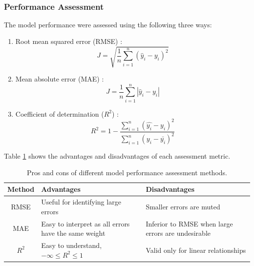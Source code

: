 \subsubsection{Performance Assessment}
The model performance were assessed using the following three ways:
\begin{enumerate}
    \item Root mean squared error (RMSE) \cite{NN}:
    \begin{equation}
        J = \sqrt{\frac{1}{n}\sum\limits^n_{i=1}(\hat{y}_i - y_i)^2}
        \label{eq:08RMSE}
    \end{equation}
    
    \item Mean absolute error (MAE) \cite{NN}:
    \begin{equation}
        J = \frac{1}{n}\sum\limits^n_{i=1}|\hat{y}_i - y_i|
        \label{eq:08MSE_Error}
    \end{equation}
    \item Coefficient of determination ($R^2$) \cite{NN}:
    \begin{equation}
        R^2 = 1 - \frac{\sum\limits^n_{i = 1}(\hat{y_i} - y_i)^2}{\sum\limits^n_{i = 1}(y_i - \bar{y_i})^2}
    \end{equation}
\end{enumerate}
Table \ref{tab:02performanceassessment} shows the advantages and disadvantages of each assessment metric.
\begin{table}[h]
    \centering
    {
    \begin{tabular}{ c | p{6.2cm} | p{6.0cm}}
         Method             & Advantages        &  Disadvantages \\
        \hline
        RMSE                &  Useful for identifying large errors                            &  Smaller errors are muted        \\
        
        MAE                 &  Easy to interpret as all errors have the same weight           &  Inferior to RMSE when large errors are undesirable \\
        
        $R^2$               &  Easy to understand, {\small $-\infty \leq R^2 \leq 1$   }                                      &  Valid only for linear relationships       \\             
    \end{tabular}}
    \caption{Pros and cons of different model performance assessment methods.}
    \label{tab:02performanceassessment}
\end{table}


